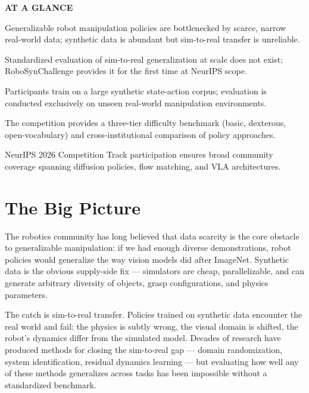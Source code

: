 \documentclass[10pt,twocolumn]{article}
\begin{document}
\begin{mdframed}[backgroundcolor=boxgray,linecolor=rulered,linewidth=1pt,
    innerleftmargin=6pt,innerrightmargin=6pt,
    innertopmargin=6pt,innerbottommargin=6pt]
\textbf{\small AT A GLANCE}\par\vspace{4pt}
\begin{description}[leftmargin=0pt,labelsep=4pt,itemsep=2pt,parsep=0pt,
    font=\small\bfseries]
  \item[Problem:] Generalizable robot manipulation policies are bottlenecked by scarce,
    narrow real-world data; synthetic data is abundant but sim-to-real transfer is unreliable.
  \item[Why it matters:] Standardized evaluation of sim-to-real generalization at scale
    does not exist; RoboSynChallenge provides it for the first time at NeurIPS scope.
  \item[Method:] Participants train on a large synthetic state-action corpus; evaluation
    is conducted exclusively on unseen real-world manipulation environments.
  \item[Result:] The competition provides a three-tier difficulty benchmark (basic,
    dexterous, open-vocabulary) and cross-institutional comparison of policy approaches.
  \item[Evidence:] NeurIPS 2026 Competition Track participation ensures broad community
    coverage spanning diffusion policies, flow matching, and VLA architectures.
\end{description}
\end{mdframed}

\section{The Big Picture}

The robotics community has long believed that data scarcity is the core obstacle to
generalizable manipulation: if we had enough diverse demonstrations, robot policies
would generalize the way vision models did after ImageNet. Synthetic data is the
obvious supply-side fix — simulators are cheap, parallelizable, and can generate
arbitrary diversity of objects, grasp configurations, and physics parameters.

The catch is sim-to-real transfer. Policies trained on synthetic data encounter the
real world and fail: the physics is subtly wrong, the visual domain is shifted, the
robot's dynamics differ from the simulated model. Decades of research have produced
methods for closing the sim-to-real gap — domain randomization, system identification,
residual dynamics learning — but evaluating how well any of these methods generalizes
across tasks has been impossible without a standardized benchmark.
\end{document}
